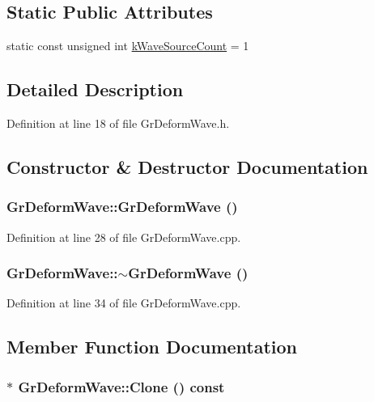 \subsection*{Static Public Attributes}
\begin{CompactItemize}
\item 
static const unsigned int \hyperlink{class_gr_deform_wave_aa0c4ae9eb424f303e5e4437ed721914}{kWaveSourceCount} = 1
\end{CompactItemize}


\subsection{Detailed Description}


Definition at line 18 of file GrDeformWave.h.

\subsection{Constructor \& Destructor Documentation}
\hypertarget{class_gr_deform_wave_c69debe17459a77adfc024a78180bbeb}{
\subsubsection[{GrDeformWave}]{\setlength{\rightskip}{0pt plus 5cm}GrDeformWave::GrDeformWave ()}}
\label{class_gr_deform_wave_c69debe17459a77adfc024a78180bbeb}




Definition at line 28 of file GrDeformWave.cpp.\hypertarget{class_gr_deform_wave_feb85501dea03ea7b400b4dca6b4bb32}{
\subsubsection[{$\sim$GrDeformWave}]{\setlength{\rightskip}{0pt plus 5cm}GrDeformWave::$\sim$GrDeformWave ()}}
\label{class_gr_deform_wave_feb85501dea03ea7b400b4dca6b4bb32}




Definition at line 34 of file GrDeformWave.cpp.

\subsection{Member Function Documentation}
\hypertarget{class_gr_deform_wave_10a98b00fc599df89a98ba33544c9569}{
\subsubsection[{Clone}]{ $\ast$ GrDeformWave::Clone () const}}
\label{class_gr_deform_wave_10a98b00fc599df89a98ba33544c9569}




